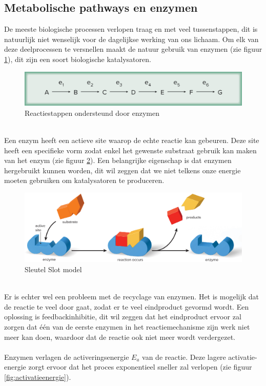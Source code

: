 \documentclass[a4paper,kul]{kulakarticle} %
\begin{document}
\subsection{Metabolische pathways en enzymen}
\label{sec:enzymen}
De meeste biologische processen verlopen traag en met veel tussenstappen, dit is natuurlijk niet wenselijk voor de dagelijkse werking van ons lichaam. Om elk van deze deelprocessen te versnellen maakt de natuur gebruik van enzymen (zie figuur \ref{fig:enzymenstappen}), dit zijn een soort biologische katalysatoren. 
\begin{figure}[h]
	\centering
	\includegraphics[width=0.7\linewidth]{EnzymenStappen}
	\caption[Enzymen]{Reactiestappen ondersteund door enzymen}
	\label{fig:enzymenstappen}
\end{figure}\\
Een enzym heeft een actieve site waarop de echte reactie kan gebeuren. Deze site heeft een specifieke vorm zodat enkel het gewenste substraat gebruik kan maken van het enzym (zie figuur \ref{fig:sleutelslot}). Een belangrijke eigenschap is dat enzymen hergebruikt kunnen worden, dit wil zeggen dat we niet telkens onze energie moeten gebruiken om katalysatoren te produceren. 
\begin{figure}[h]
	\centering
	\includegraphics[width=0.7\linewidth]{SleutelSlot}
	\caption[Sleutel Slot]{Sleutel Slot model}
	\label{fig:sleutelslot}
\end{figure} \\
Er is echter wel een probleem met de recyclage van enzymen. Het is mogelijk dat de reactie te veel door gaat, zodat er te veel eindproduct gevormd wordt. Een oplossing is feedbackinhibitie, dit wil zeggen dat het eindproduct ervoor zal zorgen dat één van de eerste enzymen in het reactiemechanisme zijn werk niet meer kan doen, waardoor dat de reactie ook niet meer wordt verdergezet. \\
\\
Enzymen verlagen de activeringsenergie $E_a$ van de reactie. Deze lagere activatie-energie zorgt ervoor dat het proces exponentieel sneller zal verlopen (zie figuur \ref{fig:activatieenergie}). 
\end{document}
